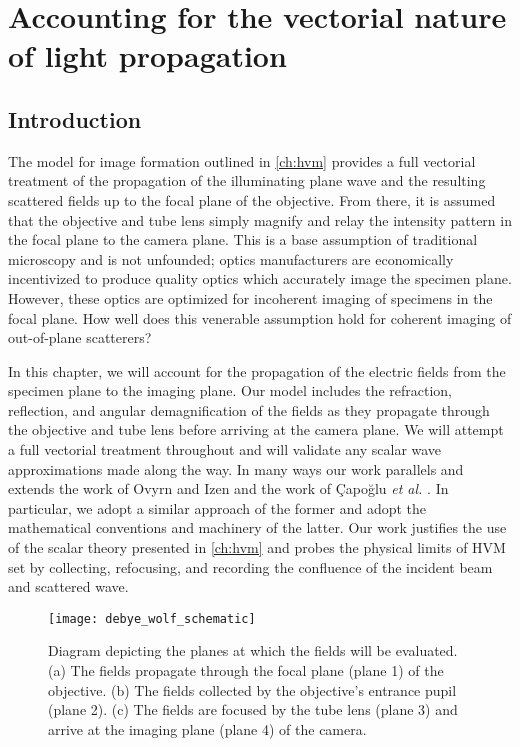 \chapter{Accounting for the vectorial nature of light propagation}
\label{ch:debye}




\section{Introduction}

The model for image formation outlined in \autoref{ch:hvm} provides a full
vectorial treatment of the propagation of the illuminating plane wave and
the resulting scattered fields up to the focal plane of the objective.
From there, it is assumed that the objective and tube lens simply magnify and
relay the intensity pattern in the focal plane to the camera plane.
This is a base assumption of traditional microscopy and is not unfounded; optics
manufacturers are economically incentivized to produce quality optics which
accurately image the specimen plane. However, these optics are optimized for
incoherent imaging of specimens in the focal plane.
How well does this venerable assumption hold for coherent imaging of out-of-plane
scatterers?

In this chapter, we will account for the propagation of the electric fields from
the specimen plane to the imaging plane. Our model includes the
refraction, reflection, and angular demagnification of the fields as they propagate
through the objective and tube lens before arriving at the camera plane.
We will attempt a full vectorial treatment throughout and will
validate any scalar wave approximations made along the way. In many ways our work
parallels and extends the work of Ovyrn and Izen\cite{izen00} and the work of
\c{C}apo\u{g}lu \emph{et al.} \cite{capoglu12}. In particular, we adopt a similar
approach of the former and adopt the mathematical conventions and machinery of the latter.
Our work justifies the use of the scalar theory presented in \autoref{ch:hvm} and
probes the physical limits of HVM set by collecting, refocusing, and recording
the confluence of the incident beam and scattered wave.

\begin{figure}
  \centering
  \texttt{[image: debye\_wolf\_schematic]}
  \caption{Diagram depicting the planes at which the fields will be evaluated.
    (a) The fields propagate through the focal plane (plane 1) of the objective.
    (b) The fields collected by the objective's entrance pupil (plane 2).
    (c) The fields are focused by the tube lens (plane 3) and arrive at the
    imaging plane (plane 4) of the camera.}
  \label{fig:debye_schematic}
\end{figure}

